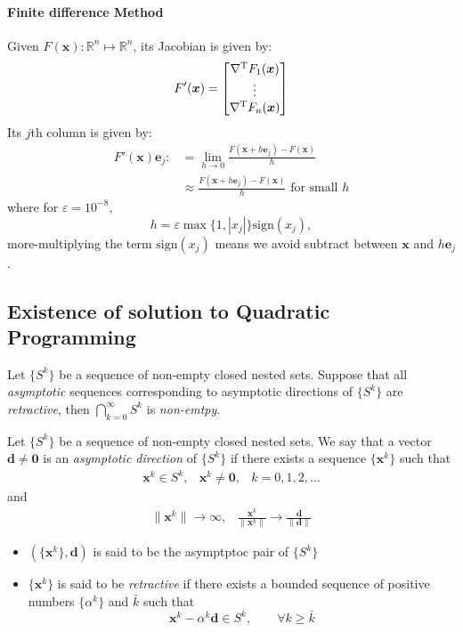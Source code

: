 \paragraph{Finite difference Method}
Given $F(\bm x): \mathbb{R}^n\mapsto\mathbb{R}^n$, its Jacobian is given by:
\[
F'(\bm x)=\begin{bmatrix}
\nabla^{\mathrm T} F_1(\bm x)\\
\vdots\\
\nabla^{\mathrm T} F_n(\bm x)
\end{bmatrix}
\]
Its $j$th column is given by:
\begin{align*}
F'(\bm x)\bm e_j:&=\lim_{h\to0}\frac{F(\bm x+h\bm e_j) - F(\bm x)}{h}\\
&\approx \frac{F(\bm x+h\bm e_j) - F(\bm x)}{h}\mbox{ for small }h
\end{align*}
where for $\varepsilon=10^{-8}$,
\[
h=\varepsilon\max\{1,|x_j|\}\mbox{sign}(x_j),
\]
more-multiplying the term $\mbox{sign}(x_j)$ means we avoid subtract between $\bm x$ and $h\bm e_j$.

\subsection{Existence of solution to Quadratic Programming}
\begin{theorem}
Let $\{S^k\}$ be a sequence of non-empty closed nested sets. Suppose that all \emph{asymptotic} sequences corresponding to asymptotic directions of $\{S^k\}$ are \emph{retractive}, then $\bigcap_{k=0}^\infty S^k$ is \emph{non-emtpy}.
\end{theorem}
\begin{definition}
Let $\{S^k\}$ be a sequence of non-empty closed nested sets. We say that a vector $\bm d\ne\bm0$ is an \emph{asymptotic direction} of $\{S^k\}$ if there exists a sequence $\{\bm x^k\}$ such that
\[
\begin{array}{lll}
\bm x^k\in S^k,
&
\bm x^k\ne\bm 0,
&
k=0,1,2,\dots
\end{array}
\]
and
\[
\begin{array}{ll}
\|\bm x^k\|\to\infty,
&
\frac{\bm x^k}{\|\bm x^k\|}\to\frac{\bm d}{\|\bm d\|}
\end{array}
\]
\begin{itemize}
\item
$(\{\bm x^k\},\bm d)$ is said to be the asymptptoc pair of $\{S^k\}$
\item
$\{\bm x^k\}$ is said to be \emph{retractive} if there exists a bounded sequence of positive numbers $\{\alpha^k\}$ and $\bar k$ such that
\[
\bm x^k-\alpha^k\bm d\in S^k,\qquad
\forall k\ge\bar k
\]
\end{itemize}
\end{definition}

